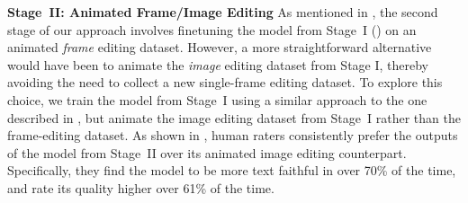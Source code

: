 \begin{table}[h!]
    \centering

    \caption{\textbf{Contribution of training with backtranslation rather than standard fine-tuning.} Human evaluation shows the win rate of \OursVideoEdit versus performing Stage~III () with standard fine-tuning rather than backtranslation.}
    \label{tab:abl_study_stage3}
\end{table}




\begin{table}[h!]
    \centering

    \caption{\textbf{Contribution of each stage in our approach.} In each row, we show the win rate of the model from a certain stage when compared to its previous stage counterpart.}
    \label{tab:abl_study}
\end{table}


\textbf{Stage~II: Animated Frame/Image Editing}
As mentioned in , the second stage of our approach involves finetuning the model from Stage~I () on an animated \textit{frame} editing dataset.
However, a more straightforward alternative would have been to animate the \textit{image} editing dataset from Stage I, thereby avoiding the need to collect a new single-frame editing dataset.
To explore this choice, we train the model from Stage~I using a similar approach to the one described in , but animate the image editing dataset from Stage~I rather than the frame-editing dataset.
As shown in , human raters consistently prefer the outputs of the model from Stage~II over its animated image editing counterpart.
Specifically, they find the model to be more text faithful in over 70\% of the time, and rate its quality higher over 61\% of the time.



